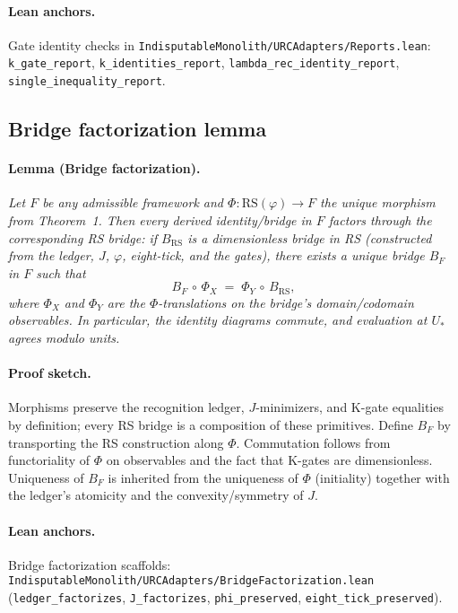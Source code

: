 \documentclass[11pt]{article}
\begin{document}
\paragraph{Lean anchors.} Gate identity checks in \texttt{IndisputableMonolith/URCAdapters/Reports.lean}: \texttt{k\_gate\_report}, \texttt{k\_identities\_report}, \texttt{lambda\_rec\_identity\_report}, \texttt{single\_inequality\_report}.

\subsection{Bridge factorization lemma}
\paragraph{Lemma (Bridge factorization).} \emph{Let \(F\) be any admissible framework and \(\Phi\colon \mathrm{RS}(\varphi)\to F\) the unique morphism from Theorem~1. Then every derived identity/bridge in \(F\) factors through the corresponding RS bridge: if \(B_{\mathrm{RS}}\) is a dimensionless bridge in RS (constructed from the ledger, \(J\), \(\varphi\), eight\mbox{-}tick, and the gates), there exists a unique bridge \(B_F\) in \(F\) such that}
\[
  B_F\,\circ\, \Phi_X \;=\; \Phi_Y\,\circ\, B_{\mathrm{RS}},
\]
\emph{where \(\Phi_X\) and \(\Phi_Y\) are the \(\Phi\)\mbox{-}translations on the bridge's domain/codomain observables. In particular, the identity diagrams commute, and evaluation at \(U_*\) agrees modulo units.}

\paragraph{Proof sketch.} Morphisms preserve the recognition ledger, \(J\)\mbox{-}minimizers, and K\mbox{-}gate equalities by definition; every RS bridge is a composition of these primitives. Define \(B_F\) by transporting the RS construction along \(\Phi\). Commutation follows from functoriality of \(\Phi\) on observables and the fact that K\mbox{-}gates are dimensionless. Uniqueness of \(B_F\) is inherited from the uniqueness of \(\Phi\) (initiality) together with the ledger's atomicity and the convexity/symmetry of \(J\).

\paragraph{Lean anchors.} Bridge factorization scaffolds: \texttt{IndisputableMonolith/URCAdapters/BridgeFactorization.lean} (\texttt{ledger\_factorizes}, \texttt{J\_factorizes}, \texttt{phi\_preserved}, \texttt{eight\_tick\_preserved}).
\end{document}
